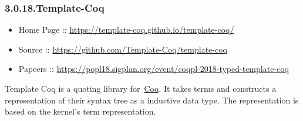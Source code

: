 \documentclass[12pt,twoside]{article}
\begin{document}
\subsubsection{3.0.18.\hspace*{0.5em}Template-Coq}\label{sec-template-coq}%

\begin{itemize}[noitemsep,topsep=\mdcompacttopsep]%

\item{}Home Page :: \href{https://template-coq.github.io/template-coq/}{{\ttfamily https://\hspace{0pt}template-\hspace{0pt}coq.\hspace{0pt}github.\hspace{0pt}io/\hspace{0pt}template-\hspace{0pt}coq/\hspace{0pt}}}%

\item{}Source :: \href{https://github.com/Template-Coq/template-coq}{{\ttfamily https://\hspace{0pt}github.\hspace{0pt}com/\hspace{0pt}Template-\hspace{0pt}Coq/\hspace{0pt}template-\hspace{0pt}coq}}%

\item{}Papeers :: \href{https://popl18.sigplan.org/event/coqpl-2018-typed-template-coq}{{\ttfamily https://\hspace{0pt}popl18.\hspace{0pt}sigplan.\hspace{0pt}org/\hspace{0pt}event/\hspace{0pt}coqpl-\hspace{0pt}2018-\hspace{0pt}typed-\hspace{0pt}template-\hspace{0pt}coq}}%
\end{itemize}%

\noindent{}Template Coq is a quoting library for~\href{http://coq.inria.fr}{Coq}. It
takes  terms and constructs a representation of their syntax tree as
a  inductive data type. The representation is based on the kernel's
term representation.%
\end{document}
